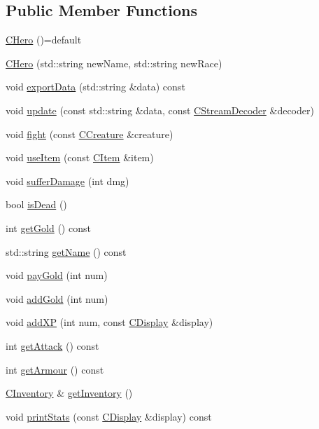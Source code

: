 \subsection*{Public Member Functions}
\begin{DoxyCompactItemize}
\item 
\mbox{\hyperlink{class_c_hero_a1d6f7e413063f4a842ed00ba0c90ee72}{C\+Hero}} ()=default
\item 
\mbox{\hyperlink{class_c_hero_aca0736bba589d24026c4947b047ec7ca}{C\+Hero}} (std\+::string new\+Name, std\+::string new\+Race)
\item 
void \mbox{\hyperlink{class_c_hero_a1593ac4dfc01368e99b2b82a21c3c6ed}{export\+Data}} (std\+::string \&data) const
\item 
void \mbox{\hyperlink{class_c_hero_a7b1a1b3c196bbe5b8da97c56f520c1f3}{update}} (const std\+::string \&data, const \mbox{\hyperlink{class_c_stream_decoder}{C\+Stream\+Decoder}} \&decoder)
\item 
void \mbox{\hyperlink{class_c_hero_a7cda26a24b8e70fc2ffe829e9c984b7e}{fight}} (const \mbox{\hyperlink{class_c_creature}{C\+Creature}} \&creature)
\item 
void \mbox{\hyperlink{class_c_hero_ae6ef1be1a9d01855208eeb82292e9f76}{use\+Item}} (const \mbox{\hyperlink{class_c_item}{C\+Item}} \&item)
\item 
void \mbox{\hyperlink{class_c_hero_a9442ae76d634a968c99d6bc77c927f96}{suffer\+Damage}} (int dmg)
\item 
bool \mbox{\hyperlink{class_c_hero_acf265a146732ccfe08db87b6cc69cef3}{is\+Dead}} ()
\item 
int \mbox{\hyperlink{class_c_hero_a5e3ad0e205d7ac9e4fd2e021a5cc959e}{get\+Gold}} () const
\item 
std\+::string \mbox{\hyperlink{class_c_hero_ae4b84144aca1948f65daa0b9734f163f}{get\+Name}} () const
\item 
void \mbox{\hyperlink{class_c_hero_a8568163de8d05b40e5c0b1d878472fd4}{pay\+Gold}} (int num)
\item 
void \mbox{\hyperlink{class_c_hero_aa906388b12b8194cf4bfc45a42027322}{add\+Gold}} (int num)
\item 
void \mbox{\hyperlink{class_c_hero_aa184a6841da51966480c2172c2f80134}{add\+XP}} (int num, const \mbox{\hyperlink{class_c_display}{C\+Display}} \&display)
\item 
int \mbox{\hyperlink{class_c_hero_a1be25c88254db1f753e1ce89da03ef46}{get\+Attack}} () const
\item 
int \mbox{\hyperlink{class_c_hero_a50d1e46ce5b1d84c6ed04493f1d71f81}{get\+Armour}} () const
\item 
\mbox{\hyperlink{class_c_inventory}{C\+Inventory}} \& \mbox{\hyperlink{class_c_hero_a2968af0dfd838d16690dc67e652b6f89}{get\+Inventory}} ()
\item 
void \mbox{\hyperlink{class_c_hero_a0232f04b4e49227ba90a8922135d4102}{print\+Stats}} (const \mbox{\hyperlink{class_c_display}{C\+Display}} \&display) const
\end{DoxyCompactItemize}
